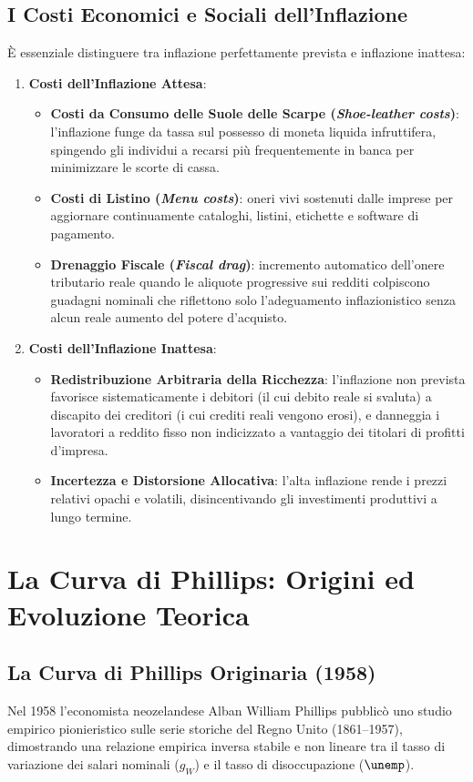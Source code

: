 \subsection{I Costi Economici e Sociali dell'Inflazione}
È essenziale distinguere tra inflazione perfettamente prevista e inflazione inattesa:
\begin{enumerate}
    \item \textbf{Costi dell'Inflazione Attesa}:
    \begin{itemize}
        \item \textbf{Costi da Consumo delle Suole delle Scarpe (\textit{Shoe-leather costs})}: l'inflazione funge da tassa sul possesso di moneta liquida infruttifera, spingendo gli individui a recarsi più frequentemente in banca per minimizzare le scorte di cassa.
        \item \textbf{Costi di Listino (\textit{Menu costs})}: oneri vivi sostenuti dalle imprese per aggiornare continuamente cataloghi, listini, etichette e software di pagamento.
        \item \textbf{Drenaggio Fiscale (\textit{Fiscal drag})}: incremento automatico dell'onere tributario reale quando le aliquote progressive sui redditi colpiscono guadagni nominali che riflettono solo l'adeguamento inflazionistico senza alcun reale aumento del potere d'acquisto.
    \end{itemize}
    \item \textbf{Costi dell'Inflazione Inattesa}:
    \begin{itemize}
        \item \textbf{Redistribuzione Arbitraria della Ricchezza}: l'inflazione non prevista favorisce sistematicamente i debitori (il cui debito reale si svaluta) a discapito dei creditori (i cui crediti reali vengono erosi), e danneggia i lavoratori a reddito fisso non indicizzato a vantaggio dei titolari di profitti d'impresa.
        \item \textbf{Incertezza e Distorsione Allocativa}: l'alta inflazione rende i prezzi relativi opachi e volatili, disincentivando gli investimenti produttivi a lungo termine.
    \end{itemize}
\end{enumerate}

\section{La Curva di Phillips: Origini ed Evoluzione Teorica}

\subsection{La Curva di Phillips Originaria (1958)}
Nel 1958 l'economista neozelandese Alban William Phillips pubblicò uno studio empirico pionieristico sulle serie storiche del Regno Unito (1861--1957), dimostrando una relazione empirica inversa stabile e non lineare tra il tasso di variazione dei salari nominali ($g_W$) e il tasso di disoccupazione ($\unemp$).

